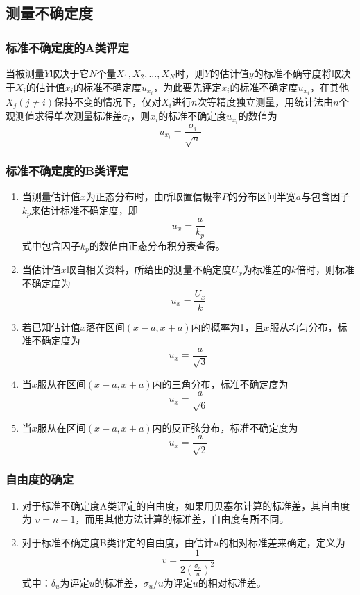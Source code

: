 \subsection{测量不确定度}
\subsubsection{标准不确定度的A类评定}
当被测量$ Y $取决于它$ N $个量$ X_1,X_2,...,X_N $时，则$ Y $的估计值$ y $的标准不确守度将取决于$ X_i $的估计值$ x_i $的标准不确定度$ u_{x_i} $，为此要先评定$ x_i $的标准不确定度$ u_{x_i} $，在其他$ X_j(j\neq i) $保持不变的情况下，仅对$ X_i $进行$ n $次等精度独立测量，用统计法由$ n $个观测值求得单次测量标准差$ \sigma_i $，则$ x_i $的标准不确定度$ u_{x_i} $的数值为\[ u_{x_i}=\frac{\sigma_i}{\sqrt{n}} \]
\subsubsection{标准不确定度的B类评定}
\begin{enumerate}
	\item 当测量估计值$ x $为正态分布时，由所取置信概率$ P $的分布区间半宽$ a $与包含因子$ k_p $来估计标准不确定度，即\[ u_x=\frac{a}{k_p} \]
	式中包含因子$ k_p $的数值由正态分布积分表查得。
	\item 当估计值$ x $取自相关资料，所给出的测量不确定度$ U_x $为标准差的$ k $倍时，则标准不确定度为\[ u_x=\frac{U_x}{k} \]
	\item 若已知估计值$ x $落在区间$ (x-a,x+a) $内的概率为1，且$ x $服从均匀分布，标准不确定度为\[ u_x=\frac{a}{\sqrt{3}} \]
	\item 当$ x $服从在区间$ (x-a,x+a) $内的三角分布，标准不确定度为\[ u_x=\frac{a}{\sqrt{6}} \]
	\item 当$ x $服从在区间$ (x-a,x+a) $内的反正弦分布，标准不确定度为\[ u_x=\frac{a}{\sqrt{2}} \]
\end{enumerate}
\subsubsection{自由度的确定}
\begin{enumerate}
	\item 对于标准不确定度A类评定的自由度，如果用贝塞尔计算的标准差，其自由度为 $ v=n-1 $，而用其他方法计算的标准差，自由度有所不同。
	\item 对于标准不确定度B类评定的自由度，由估计$ u $的相对标准差来确定，定义为\[ v=\frac{1}{2(\frac{\sigma_u}{u})^2} \]
	式中：$ \delta_u $为评定$ u $的标准差，$ \sigma_u/u $为评定$ u $的相对标准差。
\end{enumerate}
